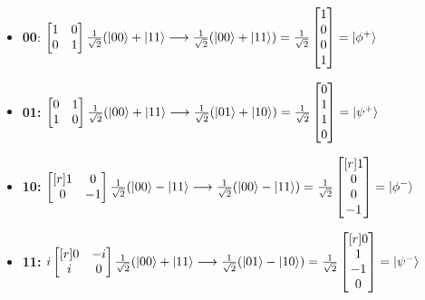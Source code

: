 \documentclass[11pt, oneside]{article}   	%
\begin{document}
\begin{itemize}
\item \textbf{00}: $\begin{bmatrix} 1 & 0 \\ 0 & 1 \end{bmatrix}  \frac{1}{\sqrt{2}} (\ket{00} + \ket{11} \longrightarrow  \frac{1}{\sqrt{2}} (\ket{00} + \ket{11}) =
\frac{1}{\sqrt{2}} \begin{bmatrix} 1 \\ 0 \\  0 \\ 1 \end{bmatrix} = \ket{\phi^+}$

\item \textbf{01:} $\begin{bmatrix} 0 & 1 \\ 1 & 0 \end{bmatrix} \frac{1}{\sqrt{2}} (\ket{00} + \ket{11} \longrightarrow  \frac{1}{\sqrt{2}} (\ket{01} + \ket{10}) =
\frac{1}{\sqrt{2}} \begin{bmatrix} 0 \\ 1 \\  1 \\ 0 \end{bmatrix} = \ket{\psi^+}$

\item \textbf{10:} $\begin{bmatrix}[r] 1 & 0 \\ 0 & -1 \end{bmatrix}  \frac{1}{\sqrt{2}} (\ket{00} - \ket{11} \longrightarrow  \frac{1}{\sqrt{2}} (\ket{00} - \ket{11}) =
\frac{1}{\sqrt{2}} \begin{bmatrix}[r] 1 \\ 0 \\  0 \\  -1 \end{bmatrix} = \ket{\phi^-}$

\item \textbf{11:}  $i  \begin{bmatrix}[r] 0 & -i \\ i & 0 \end{bmatrix} \frac{1}{\sqrt{2}} (\ket{00} + \ket{11} \longrightarrow  \frac{1}{\sqrt{2}} (\ket{01} - \ket{10}) =
\frac{1}{\sqrt{2}} \begin{bmatrix}[r] 0 \\ 1 \\  -1 \\ 0 \end{bmatrix} = \ket{\psi^-}$
\end{itemize}
\end{document}
